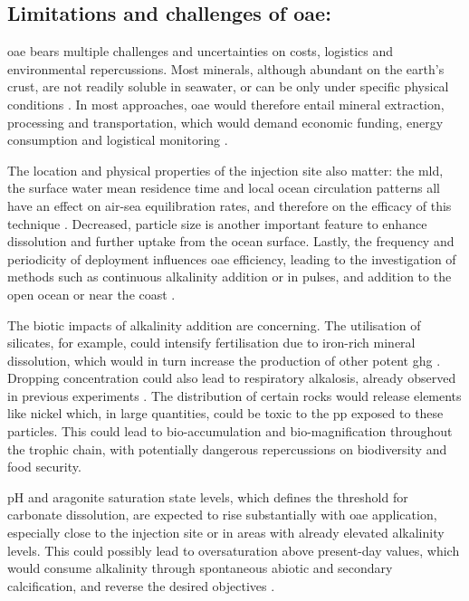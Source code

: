 \subsection[Limitations and challenges of \texorpdfstring{OAE}{OAE}]{Limitations and challenges of \ac{oae}:}

\ac{oae} bears multiple challenges and uncertainties on costs, logistics and environmental repercussions. Most minerals, although abundant on the earth's crust, are not readily soluble in seawater, or can be only under specific physical conditions \citep{kheshgi1995sequestering}. In most approaches, \ac{oae} would therefore entail mineral extraction, processing and transportation, which would demand economic funding, energy consumption and logistical monitoring \citep{NAP26278}. 

The location and physical properties of the injection site also matter: the \ac{mld}, the surface water mean residence time and local ocean circulation patterns all have an effect on air-sea equilibration rates, and therefore on the efficacy of this technique \citep{wang2023simulated, he2022limits}. Decreased, particle size is another important feature to enhance dissolution and further  uptake from the ocean surface. Lastly, the frequency and periodicity of deployment influences \ac{oae} efficiency, leading to the investigation of methods such as continuous alkalinity addition or in pulses, and addition to the open ocean or near the coast \citep{NAP26278}.

The biotic impacts of alkalinity addition are concerning. The utilisation of silicates, for example, could intensify fertilisation due to iron-rich mineral dissolution, which would in turn increase the production of other potent \ac{ghg} \citep{renforth2017assessing}. Dropping  concentration could also lead to respiratory alkalosis, already observed in previous experiments \citep{cripps2013biological}. The distribution of certain rocks would release elements like nickel which, in large quantities, could be toxic to the \ac{pp} exposed to these particles. This could lead to bio-accumulation and bio-magnification throughout the trophic chain, with potentially dangerous repercussions on biodiversity and food security. 

pH and aragonite saturation state levels, which defines the threshold for carbonate dissolution, are expected to rise substantially with \ac{oae} application, especially close to the injection site or in areas with already elevated alkalinity levels. This could possibly lead to oversaturation above present-day values, which would consume alkalinity through spontaneous abiotic and secondary calcification, and reverse the desired objectives \citep{NAP26278, de1984ph}.


